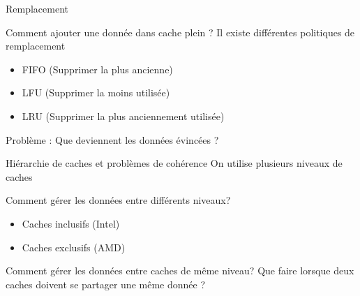 \begin{frame}{Remplacement}
	\begin{block}{Comment ajouter une donnée dans cache plein ?}
		Il existe différentes politiques de remplacement
		\begin{itemize}
			\item{FIFO (Supprimer la plus ancienne)}
			\item{LFU (Supprimer la moins utilisée)}
			\item{LRU (Supprimer la plus anciennement utilisée)}
		\end{itemize}
	\end{block}
	Problème : Que deviennent les données évincées ?
\end{frame}

\begin{frame}{Hiérarchie de caches et problèmes de cohérence}
On utilise plusieurs niveaux de caches
\begin{block}{Comment gérer les données entre différents niveaux?}
		\begin{itemize}
			\item{Caches inclusifs (Intel)}
			\item{Caches exclusifs (AMD)}
		\end{itemize}
	\end{block}
	\begin{block}{Comment gérer les données entre caches de même niveau?}
		Que faire lorsque deux caches doivent se partager une même donnée ?
	\end{block}
\end{frame}
